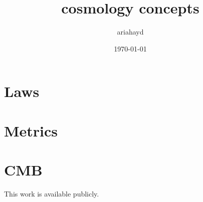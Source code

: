 \documentclass{paper}
\title{cosmology concepts}
\author{ariahayd}
\date{\today}
\begin{document}
 

\maketitle

\section{Laws}

\section{Metrics} 

\section{CMB}

This work is available publicly.\cite{Hayden_Cosmology_Source_Repo}

\pagebreak
\printbibliography
\end{document}
